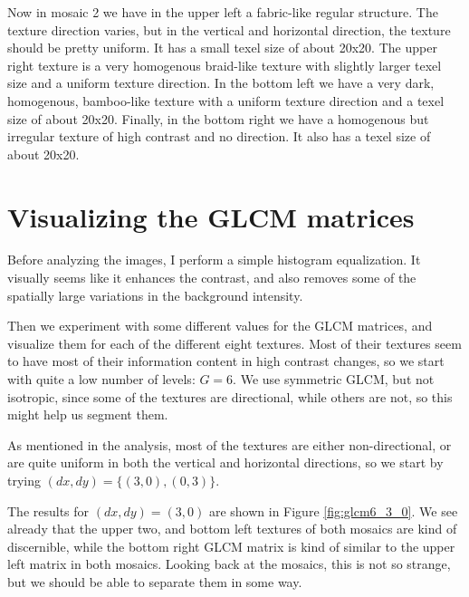 \documentclass[a4paper]{article}
\begin{document}
Now in mosaic 2 we have in the upper left a fabric-like regular
structure. The texture direction varies, but in the vertical and
horizontal direction, the texture should be pretty uniform. It has a
small texel size of about 20x20. The upper right texture is a very
homogenous braid-like texture with slightly larger texel size and a
uniform texture direction. In the bottom left we have a very dark,
homogenous, bamboo-like texture with a uniform texture direction and a
texel size of about 20x20. Finally, in the bottom right we have a
homogenous but irregular texture of high contrast and no direction. It
also has a texel size of about 20x20.

\section{Visualizing the GLCM matrices}

Before analyzing the images, I perform a simple histogram equalization.
It visually seems like it enhances the contrast, and also removes some
of the spatially large variations in the background intensity. 

Then we experiment with some different values for the GLCM matrices, and
visualize them for each of the different eight textures. Most of their
textures seem to have most of their information content in high contrast
changes, so we start with quite a low number of levels: $G = 6$. We
use symmetric GLCM, but not isotropic, since some of the textures are
directional, while others are not, so this might help us segment them.

As mentioned in the analysis, most of the textures are either
non-directional, or are quite uniform in both the vertical and
horizontal directions, so we start by trying $(dx, dy) = \{(3, 0), (0,
3)\}$.

The results for $(dx, dy) = (3, 0)$ are shown in Figure
\ref{fig:glcm6_3_0}. We see already that the upper two, and bottom left
textures of both mosaics are kind of discernible, while the bottom right
GLCM matrix is kind of similar to the upper left matrix in both mosaics.
Looking back at the mosaics, this is not so strange, but we should be
able to separate them in some way.
\end{document}
